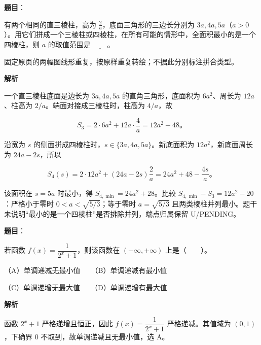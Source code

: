 \begin{answer}

\textbf{题目}：

有两个相同的直三棱柱，高为 $\frac2a$，底面三角形的三边长分别为 $3a,4a,5a$（$a>0$）。用它们拼成一个三棱柱或四棱柱，在所有可能的情形中，全面积最小的是一个四棱柱，则 $a$ 的取值范围是 $\underline{\qquad}$。
\nopagebreak[4]
\begin{center}\end{center}
\nopagebreak[4]
\begin{gktip}
固定原页的两幅图线形重复，按原样重复转绘；不据此分别标注拼合类型。
\end{gktip}

\textbf{解析}

一个直三棱柱底面是边长为 $3a,4a,5a$ 的直角三角形，底面积为 $6a^2$、周长为 $12a$、柱高为 $2/a$。端面对接成三棱柱时，柱高为 $4/a$，故

\nopagebreak[4]
\[
S_3=2\cdot6a^2+12a\cdot\frac4a=12a^2+48\mbox{。}
\]

沿宽为 $s$ 的侧面拼成四棱柱时，$s\in\{3a,4a,5a\}$。新底面积为 $12a^2$，新底面周长为 $24a-2s$，所以

\nopagebreak[4]
\[
S_4(s)=2\cdot12a^2+(24a-2s)\frac2a
=24a^2+48-\frac{4s}{a}\mbox{。}
\]

该面积在 $s=5a$ 时最小，得 $S_{4,\min}=24a^2+28$。比较 $S_{4,\min}-S_3=12a^2-20$：严格小于零时 $0<a<\sqrt{5/3}$；等于零时 $a=\sqrt{5/3}$ 且两类棱柱并列最小。题干未说明“最小的是一个四棱柱”是否排除并列，端点归属保留 U/PENDING。


\end{answer}
\begin{answer}

\textbf{题目}：

若函数 $f(x)=\dfrac{1}{2^x+1}$，则该函数在 $(-\infty,+\infty)$ 上是\mbox{（　　）}。

（A）单调递减无最小值　　（B）单调递减有最小值

（C）单调递增无最大值　　（D）单调递增有最大值

\textbf{解析}

函数 $2^x+1$ 严格递增且恒正，因此 $f(x)=\dfrac1{2^x+1}$ 严格递减。其值域为 $(0,1)$，下确界 $0$ 不取到，故单调递减且无最小值，选 A。


\end{answer}
